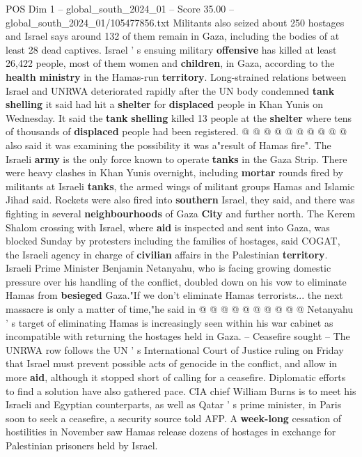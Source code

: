 \begin{textsample}{POS Dim 1 – global\_south\_2024\_01 – Score 35.00 – global\_south\_2024\_01/105477856.txt}
Militants also seized about 250 hostages and Israel says around 132 of them remain in Gaza, including the bodies of at least 28 dead captives.
Israel ' s ensuing military \textbf{offensive} has killed at least 26,422 people, most of them women and \textbf{children}, in Gaza, according to the \textbf{health} \textbf{ministry} in the Hamas-run \textbf{territory}.
Long-strained relations between Israel and UNRWA deteriorated rapidly after the UN body condemned \textbf{tank} \textbf{shelling} it said had hit a \textbf{shelter} for \textbf{displaced} people in Khan Yunis on Wednesday.
It said the \textbf{tank} \textbf{shelling} killed 13 people at the \textbf{shelter} where tens of thousands of \textbf{displaced} people had been registered. @ @ @ @ @ @ @ @ @ @ also said it was examining the possibility it was a"result of Hamas fire".
The Israeli \textbf{army} is the only force known to operate \textbf{tanks} in the Gaza Strip.
There were heavy clashes in Khan Yunis overnight, including \textbf{mortar} rounds fired by militants at Israeli \textbf{tanks}, the armed wings of militant groups Hamas and Islamic Jihad said.
Rockets were also fired into \textbf{southern} Israel, they said, and there was fighting in several \textbf{neighbourhoods} of Gaza \textbf{City} and further north.
The Kerem Shalom crossing with Israel, where \textbf{aid} is inspected and sent into Gaza, was blocked Sunday by protesters including the families of hostages, said COGAT, the Israeli agency in charge of \textbf{civilian} affairs in the Palestinian \textbf{territory}.
Israeli Prime Minister Benjamin Netanyahu, who is facing growing domestic pressure over his handling of the conflict, doubled down on his vow to eliminate Hamas from \textbf{besieged} Gaza."If we don't eliminate Hamas terrorists... the next massacre is only a matter of time,"he said in @ @ @ @ @ @ @ @ @ @ Netanyahu ' s target of eliminating Hamas is increasingly seen within his war cabinet as incompatible with returning the hostages held in Gaza. -- Ceasefire sought -- The UNRWA row follows the UN ' s International Court of Justice ruling on Friday that Israel must prevent possible acts of genocide in the conflict, and allow in more \textbf{aid}, although it stopped short of calling for a ceasefire.
Diplomatic efforts to find a solution have also gathered pace.
CIA chief William Burns is to meet his Israeli and Egyptian counterparts, as well as Qatar ' s prime minister, in Paris soon to seek a ceasefire, a security source told AFP.
A \textbf{week-long} cessation of hostilities in November saw Hamas release dozens of hostages in exchange for Palestinian prisoners held by Israel.

\end{textsample}
